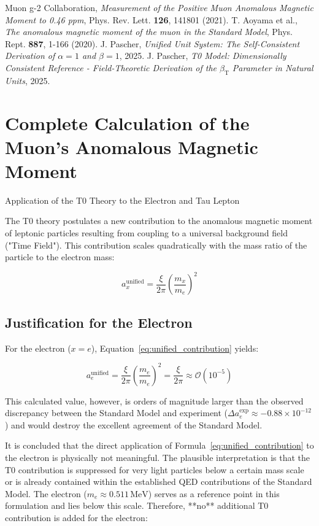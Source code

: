 \documentclass[12pt,a4paper]{article}
\newcommand{\betaT}{\beta_{\text{T}}}
\begin{document}
	\begin{thebibliography}{99}
		 Muon g-2 Collaboration, \textit{Measurement of the Positive Muon Anomalous Magnetic Moment to 0.46 ppm}, Phys. Rev. Lett. \textbf{126}, 141801 (2021).
		 T. Aoyama et al., \textit{The anomalous magnetic moment of the muon in the Standard Model}, Phys. Rept. \textbf{887}, 1-166 (2020).
		 J. Pascher, \textit{Unified Unit System: The Self-Consistent Derivation of  $\alpha = 1$ and $\beta = 1$}, 2025.
		 J. Pascher, \textit{T0 Model: Dimensionally Consistent Reference - Field-Theoretic Derivation of the  $\betaT$ Parameter in Natural Units}, 2025.

\section{Complete Calculation of the Muon's Anomalous Magnetic Moment}

 Application of the T0 Theory to the Electron and Tau Lepton

The T0 theory postulates a new contribution to the anomalous magnetic moment of leptonic particles resulting from coupling to a universal background field ("Time Field"). This contribution scales quadratically with the mass ratio of the particle to the electron mass:

\begin{equation}
	a_x^{\text{unified}} = \frac{\xi}{2\pi} \left( \frac{m_x}{m_e} \right)^2
	\label{eq:unified_contribution}
\end{equation}

\subsection{Justification for the Electron}

For the electron (\(x = e\)), Equation~\ref{eq:unified_contribution} yields:

\[
a_e^{\text{unified}} = \frac{\xi}{2\pi} \left( \frac{m_e}{m_e} \right)^2 = \frac{\xi}{2\pi} \approx \mathcal{O}(10^{-5})
\]

This calculated value, however, is orders of magnitude larger than the observed discrepancy between the Standard Model and experiment (\(\Delta a_e^{\text{exp}} \approx -0.88 \times 10^{-12}\)) and would destroy the excellent agreement of the Standard Model.

It is concluded that the direct application of Formula~\ref{eq:unified_contribution} to the electron is physically not meaningful. The plausible interpretation is that the T0 contribution is suppressed for very light particles below a certain mass scale or is already contained within the established QED contributions of the Standard Model. The electron (\(m_e \approx 0.511 \, \text{MeV}\)) serves as a reference point in this formulation and lies below this scale. Therefore, **no** additional T0 contribution is added for the electron:


\end{thebibliography}
\end{document}
